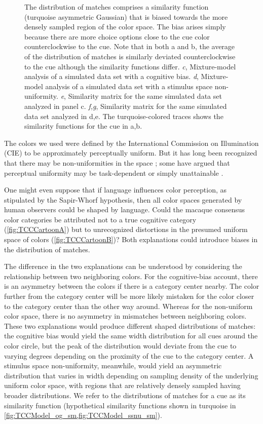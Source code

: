 \begin{figure}
\begin{fullwidth}
{	The distribution of matches comprises a similarity function (turquoise asymmetric Gaussian) that is biased towards the more densely sampled region of the color space. 
	The bias arises simply because there are more choice options close to the cue color counterclockwise to the cue. 
	Note that in both a and b, the average of the distribution of matches is similarly deviated counterclockwise to the cue although the similarity functions differ. 
	\emph{c}, Mixture-model analysis of a simulated data set with a cognitive bias. 
	\emph{d}, Mixture-model analysis of a simulated data set with a stimulus space non-uniformity. 
	\emph{e}, Similarity matrix for the same simulated data set analyzed in panel c. 
	\emph{f,g}, Similarity matrix for the same simulated data set analyzed in d,e. 
	The turquoise-colored traces shows the similarity functions for the cue in a,b.}
    \label{fig:TCCDemo}
    \end{fullwidth}
\end{figure}

The colors we used were defined by the International Commission on Illumination (CIE) to be approximately perceptually uniform. 
But it has long been recognized that there may be non-uniformities in the space \citep{stockman_colorimetry_2010}; some have argued that perceptual uniformity may be task-dependent or simply unattainable \citep{judd_ideal_1969}.

One might even suppose that if language influences color perception, as stipulated by the Sapir-Whorf hypothesis, then all color spaces generated by human observers could be shaped by language. 
Could the macaque consensus color categories be attributed not to a true cognitive category (\autoref{fig:TCCCartoonA}) but to unrecognized distortions in the presumed uniform space of colors (\autoref{fig:TCCCartoonB})?
Both explanations could introduce biases in the distribution of matches.

The difference in the two explanations can be understood by considering the relationship between two neighboring colors. 
For the cognitive-bias account, there is an asymmetry between the colors if there is a category center nearby.
The color further from the category center will be more likely mistaken for the color closer to the category center than the other way around. 
Whereas for the non-uniform color space, there is no asymmetry in mismatches between neighboring colors. 
These two explanations would produce different shaped distributions of matches: the cognitive bias would yield the same width distribution for all cues around the color circle, but the peak of the distribution would deviate from the cue to varying degrees depending on the proximity of the cue to the category center. 
A stimulus space non-uniformity, meanwhile, would yield an asymmetric distribution that varies in width depending on sampling density of the underlying uniform color space, with regions that are relatively densely sampled having broader distributions. 
We refer to the distributions of matches for a cue as its similarity function (hypothetical similarity functions shown in turquoise in \autoref{fig:TCCModel_og_sm,fig:TCCModel_ssnu_sm}).

